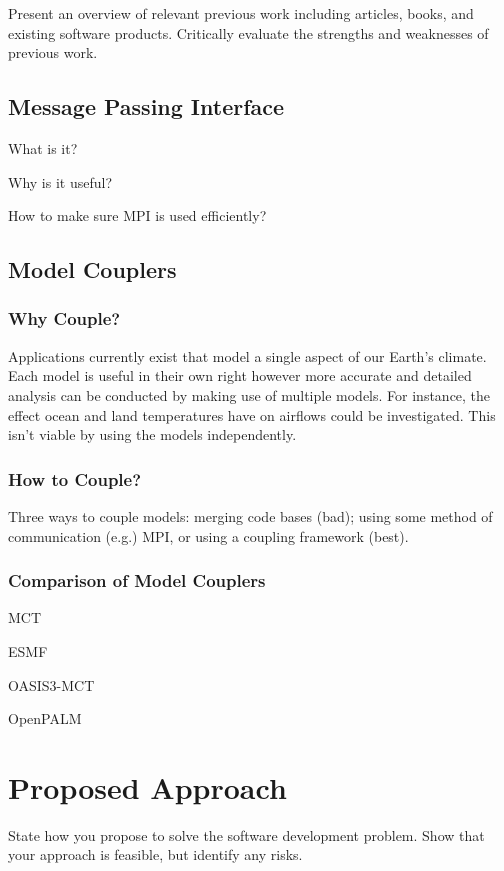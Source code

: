 \documentclass{acm_proc_article-sp}
\begin{document}
Present an overview of relevant previous work including articles, books, and
existing software products. Critically evaluate the strengths and weaknesses of
previous work.

\subsection*{Message Passing Interface}

What is it?

Why is it useful?

How to make sure MPI is used efficiently?

\subsection*{Model Couplers}

\subsubsection*{Why Couple?}

Applications currently exist that model a single aspect of our Earth's climate.
Each model is useful in their own right however more accurate and detailed
analysis can be conducted by making use of multiple models. For instance, the
effect ocean and land temperatures have on airflows could be investigated. This
isn't viable by using the models independently.

\subsubsection*{How to Couple?}

Three ways to couple models: merging code bases (bad); using some method of
communication (e.g.) MPI, or using a coupling framework (best).

\subsubsection*{Comparison of Model Couplers}

MCT

ESMF

OASIS3-MCT

OpenPALM

\section*{Proposed Approach}

State how you propose to solve the software development problem. Show that your
approach is feasible, but identify any risks.
\end{document}
